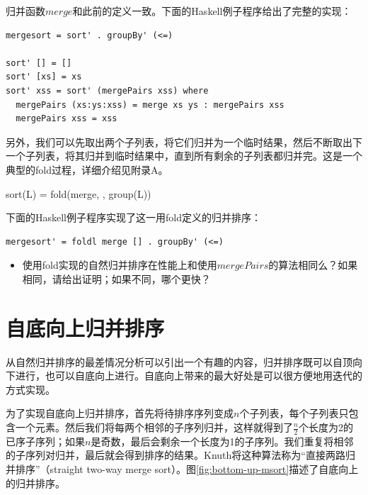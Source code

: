 \documentclass[b5paper]{ctexart}
\begin{document}
归并函数$merge$和此前的定义一致。下面的Haskell例子程序给出了完整的实现：

\lstset{language=Haskell}
\begin{lstlisting}[style=Haskell]
mergesort = sort' . groupBy' (<=)

sort' [] = []
sort' [xs] = xs
sort' xss = sort' (mergePairs xss) where
  mergePairs (xs:ys:xss) = merge xs ys : mergePairs xss
  mergePairs xss = xss
\end{lstlisting}

另外，我们可以先取出两个子列表，将它们归并为一个临时结果，然后不断取出下一个子列表，将其归并到临时结果中，直到所有剩余的子列表都归并完。这是一个典型的fold过程，详细介绍见附录A。

\be
sort(L) = fold(merge, \phi, group(L))
\ee

下面的Haskell例子程序实现了这一用fold定义的归并排序：

\lstset{language=Haskell}
\begin{lstlisting}[style=Haskell]
mergesort' = foldl merge [] . groupBy' (<=)
\end{lstlisting}

\begin{Exercise}
\begin{itemize}
  \item 使用fold实现的自然归并排序在性能上和使用$mergePairs$的算法相同么？如果相同，请给出证明；如果不同，哪个更快？
\end{itemize}
\end{Exercise}

\section{自底向上归并排序}

从自然归并排序的最差情况分析可以引出一个有趣的内容，归并排序既可以自顶向下进行，也可以自底向上进行。自底向上带来的最大好处是可以很方便地用迭代的方式实现。

为了实现自底向上归并排序，首先将待排序序列变成$n$个子列表，每个子列表只包含一个元素。然后我们将每两个相邻的子序列归并，这样就得到了$\frac{n}{2}$个长度为2的已序子序列；如果$n$是奇数，最后会剩余一个长度为1的子序列。我们重复将相邻的子序列对归并，最后就会得到排序的结果。Knuth将这种算法称为“直接两路归并排序”（straight two-way merge sort）\cite{TAOCP}。图\ref{fig:bottom-up-msort}描述了自底向上的归并排序。
\end{document}
